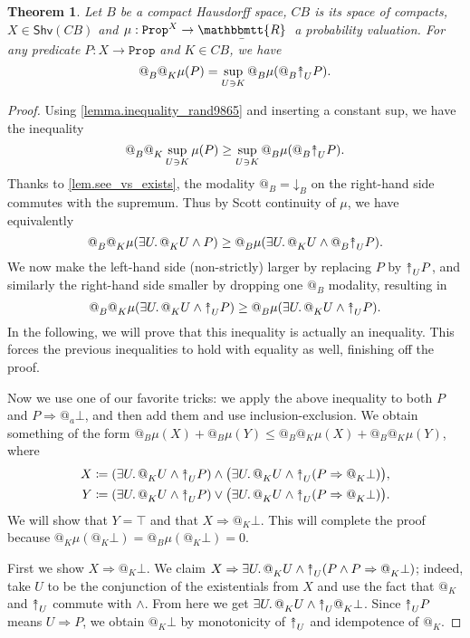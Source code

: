 \documentclass[11pt, oneside, article]{memoir}
\makeatletter
\theoremstyle{plain}
\newtheorem{theorem}{Theorem}[chapter] %
\theoremstyle{definition}
\theoremstyle{remark}
\newcommand{\const}[1]{\mathtt{#1}}
\newcommand{\Fun}[1]{\mathsf{#1}}
\newcommand{\ubar}[1]{\underaccent{\bar}{#1}}
\newcommand{\internal}[1]{\raisebox{-.03ex}{$\mathbbmtt{#1}$}}
\newcommand{\hs}{\hspace{1.1pt}}
\newcommand{\tRR}{\internal{R}\hs}
\newcommand{\tLR}{\ubar{\tRR}\hs}
\newcommand{\Shv}{\Fun{Shv}}
\newcommand{\Prop}{\const{Prop}}
\newcommand{\BaseSpace}{B}
\newcommand{\AtSymbol}{{@}}
\newcommand{\SeeSymbol}{{\down}}  %
\newcommand{\InSymbol}{{\upclose}}%
\newcommand{\At}[2][]{\AtSymbol^{#1}_{#2}}
\newcommand{\See}[2][]{\SeeSymbol^{#1}_{#2}}
\newcommand{\In}[2][]{\InSymbol^{#1}_{#2}}
\newcommand{\upclose}{{\rotatebox[origin=c]{90}{$\twoheadrightarrow$}}}
\newcommand{\down}{\mathord{\downarrow}}
\newcommand{\imp}{\Rightarrow}
\makeatother
\begin{document}
\begin{theorem}\label{thm.discrete_internal_space}
Let $\BaseSpace$ be a compact Hausdorff space, $C\BaseSpace$ is its space of compacts, $X\in \Shv(C\BaseSpace)$ and $\mu : \Prop^X \to \tLR$ a probability valuation. For any predicate $P:X\to\Prop$ and $K\in C\BaseSpace$, we have
\begin{equation}\label{eq:mu_formula}
\At{B} \At{K} \mu(P) = \sup_{U\ni K} \At{B} \mu(\At{B}\In{U}P).
\end{equation}
\end{theorem}
\begin{proof}
Using \cref{lemma.inequality_rand9865} and inserting a constant sup, we have the inequality
\[
	\At{\BaseSpace}\At{K} \sup_{U\ni K} \mu(P) \geq \sup_{U\ni K} \At{\BaseSpace} \mu(\At{\BaseSpace}\In{U}P) .
\]
Thanks to \cref{lem.see_vs_exists}, the modality $\At{B} = \See{B}$ on the right-hand side commutes with the supremum. Thus by Scott continuity of $\mu$, we have equivalently
\[
	\At{\BaseSpace} \At{K} \mu(\exists U\ldotp \At{K}U\wedge P) \geq \At{\BaseSpace} \mu(\exists U\ldotp \At{K}U\wedge \At{B}\In{U}P) .
\]
We now make the left-hand side (non-strictly) larger by replacing $P$ by $\In{U}P$, and similarly the right-hand side smaller by dropping one $\At{B}$ modality, resulting in
\[
	\At{\BaseSpace} \At{K} \mu(\exists U\ldotp \At{K}U\wedge\In{U}P) \geq \At{\BaseSpace} \mu(\exists U\ldotp \At{K}U\wedge\In{U}P) .
\]
In the following, we will prove that this inequality is actually an inequality. This forces the previous inequalities to hold with equality as well, finishing off the proof.

Now we use one of our favorite tricks: we apply the above inequality to both $P$ and $P\imp\At{a}\bot$, and then add them and use inclusion-exclusion.
We obtain something of the form $\At{\BaseSpace}\mu(X) + \At{\BaseSpace}\mu(Y) \leq \At{\BaseSpace}\At{K} \mu(X) + \At{\BaseSpace}\At{K} \mu(Y)$, where
\begin{align*}
	X\coloneqq(\exists U\ldotp \At{K}U\wedge\In{U}P)\wedge\big(\exists U\ldotp \At{K}U\wedge\In{U}(P\imp\At{K}\bot)\big), \\
	Y\coloneqq(\exists U\ldotp \At{K}U\wedge\In{U}P)\vee\big(\exists U\ldotp \At{K}U\wedge\In{U}(P\imp\At{K}\bot)\big).	
\end{align*}
We will show that $Y=\top$ and that $X\imp\At{K}\bot$. This will complete the proof because $\At{K}\mu(\At{K}\bot) = \At{B}\mu(\At{K}\bot) = 0$.

First we show $X\imp\At{K}\bot$. We claim $X\imp\exists U\ldotp \At{K}U\wedge\In{U}(P\wedge P\imp\At{K}\bot)$; indeed, take $U$ to be the conjunction of the existentials from $X$ and use the fact that $\At{K}$ and $\In{U}$ commute with $\wedge$. From here we get $\exists U\ldotp\At{K}U\wedge\In{U}\At{K}\bot$. Since $\In{U}P$ means $U\imp P$, we obtain $\At{K}\bot$ by monotonicity of $\In{U}$ and idempotence of $\At{K}$.


\end{proof}
\end{document}
